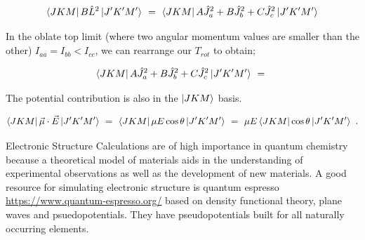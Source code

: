 \documentclass{article}
\newcounter{subsubsubsection}[subsubsection]
\begin{document}
\begin{equation} \label{eb-eq-256-110}
\bra{J K M}B\hat{L}^{2}\ket{J' K' M'} \hspace{0.125cm} = \hspace{0.125cm} \bra{J K M} A \hat{J}_{a}^{2} + B \hat{J}_{b}^{2} + C \hat{J}_{c}^{2}\ket{J' K' M'}
\end{equation}

In the oblate top limit (where two angular momentum values are smaller than the other) \begin{math} I_{aa} = I_{bb} < I_{cc} \end{math}, we can rearrange our \begin{math} T_{rot} \end{math} to obtain;

\begin{equation} \label{eb-eq-257-2}
\bra{J K M} A \hat{J}_{a}^{2} + B \hat{J}_{b}^{2} + C \hat{J}_{c}^{2}\ket{J' K' M'} \hspace{0.125cm} = \hspace{0.125cm} 
\end{equation}










The potential contribution is also in the \begin{math} \ket{J K M} \end{math} basis. 

\begin{equation} \label{eb-eq-256-111}
\bra{J K M}\vec{\mu}\cdot\vec{E}\ket{J' K' M'} \hspace{0.125cm} = \hspace{0.125cm} \bra{J K M}\mu E\cos\theta\ket{J' K' M'} \hspace{0.125cm} = \hspace{0.125cm} \mu E\bra{J K M}\cos\theta\ket{J' K' M'} \hspace{0.125cm}.
\end{equation}

Electronic Structure Calculations are of high importance in quantum chemistry because a theoretical model of materials aids in the understanding of experimental observations as well as the development of new materials. A good resource for simulating electronic structure is quantum espresso \url{https://www.quantum-espresso.org/} based on density functional theory, plane waves and psuedopotentials. They have pseudopotentials built for all naturally occurring elements. 
\end{document}
